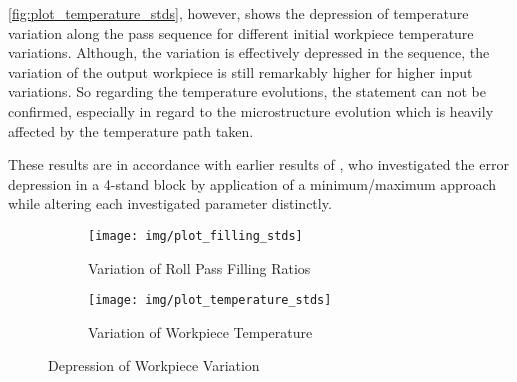 \autoref{fig:plot_temperature_stds}, however, shows the depression of temperature variation along the pass sequence for different initial workpiece temperature variations.
Although, the variation is effectively depressed in the sequence, the variation of the output workpiece is still remarkably higher for higher input variations.
So regarding the temperature evolutions, the statement can not be confirmed, especially in regard to the microstructure evolution which is heavily affected by the temperature path taken.

These results are in accordance with earlier results of \textcite{Mauk1999}, who investigated the error depression in a 4-stand block by application of a minimum/maximum approach while altering each investigated parameter distinctly.

\begin{figure}
    \begin{subfigure}{\linewidth}
        \centering
        \texttt{[image: img/plot\_filling\_stds]}
        \caption{Variation of Roll Pass Filling Ratios}
        \label{fig:plot_filling_stds}
    \end{subfigure}
    \begin{subfigure}{\linewidth}
        \centering
        \texttt{[image: img/plot\_temperature\_stds]}
        \caption{Variation of Workpiece Temperature}
        \label{fig:plot_temperature_stds}
    \end{subfigure}
    \caption{Depression of Workpiece Variation}
\end{figure}